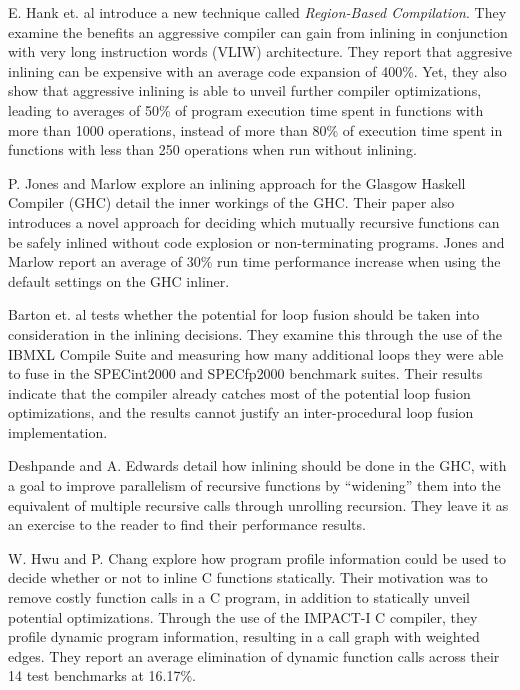 E. Hank et. al \cite{RegionBasedCompilationIntroduction} introduce a new
technique called \textit{Region-Based Compilation}. They examine the benefits an
aggressive compiler can gain from inlining in conjunction with very long
instruction words (VLIW) architecture. They report that aggresive inlining can
be expensive with an average code expansion of 400\%. Yet, they also show that
aggressive inlining is able to unveil further compiler optimizations, leading to
averages of 50\% of program execution time spent in functions with more than
1000 operations, instead of more than 80\% of execution time spent in functions
with less than 250 operations when run without inlining.

P. Jones and Marlow \cite{GHCPaper} explore an inlining approach for the Glasgow
Haskell Compiler (GHC) detail the inner workings of the GHC. Their paper also
introduces a novel approach for deciding which mutually recursive functions can
be safely inlined without code explosion or non-terminating programs. Jones and
Marlow report an average of 30\% run time performance increase when using the
default settings on the GHC inliner.

Barton et. al \cite{ShouldLoopOptsInfluenceInlining} tests whether the potential
for loop fusion should be taken into consideration in the inlining decisions.
They examine this through the use of the IBM\textregistered XL Compile
Suite and measuring how many additional loops they were able to fuse in the
SPECint2000 and SPECfp2000 benchmark suites. Their results indicate that the
compiler already catches most of the potential loop fusion optimizations, and
the results cannot justify an inter-procedural loop fusion implementation.

Deshpande and A. Edwards \cite{deshpande2012statically} detail how inlining
should be done in the GHC, with a goal to improve parallelism of recursive
functions by ``widening'' them into the equivalent of multiple recursive calls
through unrolling recursion. They leave it as an exercise to the reader to find
their performance results.

W. Hwu and P. Chang \cite{InlineFuncExpCProgs} explore how program profile
information could be used to decide whether or not to inline C functions
statically. Their motivation was to remove costly function calls in a C program,
in addition to statically unveil potential optimizations. Through the use of the
IMPACT-I C compiler, they profile dynamic program information, resulting in a
call graph with weighted edges. They report an average
elimination of dynamic function calls across their 14 test benchmarks at
16.17\%.
